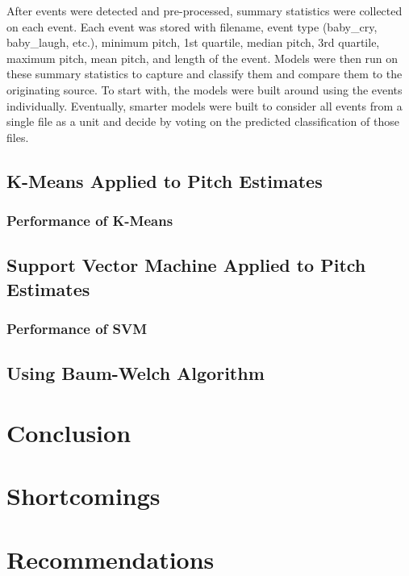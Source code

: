 \documentclass[paper=a4, fontsize=11pt]{scrartcl}
\numberwithin{equation}{section}
\numberwithin{figure}{section}
\numberwithin{table}{section}
\begin{document}
\noindent After events were detected and pre-processed, summary statistics were collected on each event. Each event was stored with filename, event type (baby\_cry, baby\_laugh, etc.), minimum pitch, 1st quartile, median pitch, 3rd quartile, maximum pitch, mean pitch, and length of the event. Models were then run on these summary statistics to capture and classify them and compare them to the originating source. To start with, the models were built around using the events individually. Eventually, smarter models were built to consider all events from a single file as a unit and decide by voting on the predicted classification of those files.


\subsection{K-Means Applied to Pitch Estimates}
\subsubsection{Performance of K-Means}
\subsection{Support Vector Machine Applied to Pitch Estimates}
\subsubsection{Performance of SVM}

\subsection{Using Baum-Welch Algorithm}

\section{Conclusion}

\section{Shortcomings}

\section{Recommendations}
\end{document}
